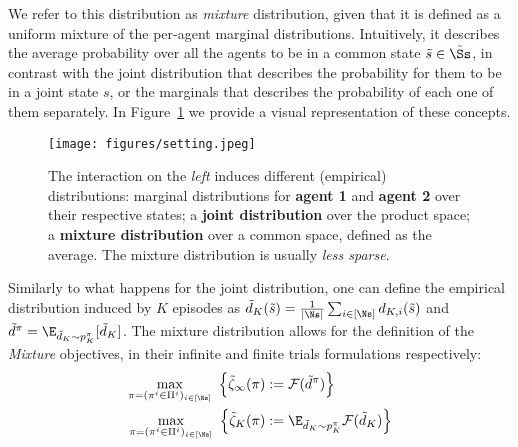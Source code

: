 We refer to this distribution as \emph{mixture} distribution, given that it is defined as a uniform mixture of the per-agent marginal distributions. Intuitively, it describes the average probability over all the agents to be in a common state $\tilde s \in \tilde \Ss$, in contrast with the joint distribution that describes the probability for them to be in a joint state $s$, or the marginals that describes the probability of each one of them separately. In Figure~\ref{fig:distributions} we provide a visual representation of these concepts.

\begin{figure}[h]
    \centering
    \begin{minipage}{\linewidth} %
        \centering
        \texttt{[image: figures/setting.jpeg]}
        \caption{\centering The interaction on the \emph{left} induces different (empirical) distributions: marginal distributions for \textcolor{softred}{\textbf{agent 1}} and \textcolor{softgreen}{\textbf{agent 2}} over their respective states; a \textcolor{softblue}{\textbf{joint distribution}} over the product space; a \textcolor{softorange}{\textbf{mixture distribution}} over a common space, defined as the average. The mixture distribution is usually \emph{less sparse}.}
        \label{fig:distributions}
    \end{minipage}
    \vspace{-10pt}
\end{figure}

Similarly to what happens for the joint distribution, one can define the empirical distribution induced by $K$ episodes as $\tilde d_{K} (\tilde s) = \frac{1}{|\Ns|} \sum_{i \in [\Ns]}  d_{K,i}(\tilde s)$ and $\tilde d^\pi = \E_{\tilde d_K\sim p^\pi_K}[\tilde d_K]$. The mixture distribution allows for the definition of the \emph{Mixture} objectives, in their infinite and finite trials formulations respectively:
\vspace{-0.2cm}
\begin{align}
        \max_{\pi = (\pi^i\in \Pi^i)_{i \in [\Ns]}} \ \Big\{ \tilde \zeta_\infty(\pi) &:= \mathcal F (\tilde d^{\pi}) \Big\} \label{eq:mse_mixture}\\
        \max_{\pi = (\pi^i\in \Pi^i)_{i \in [\Ns]}} \ \Big\{ \tilde \zeta_K(\pi) &:= \E_{\tilde d_{K}\sim p^\pi_K}\mathcal F (\tilde d_{K}) \Big\} \label{eq:mse_mixture_finite}
\end{align}

